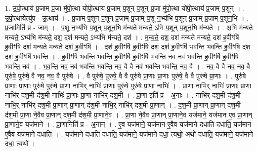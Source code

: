 \documentclass[17pt]{extarticle}
\begin{document}
1. उ॒पो॒त्थाय॑ प्र॒जाम् प्र॒जा मु॑पो॒त्था यो॑पो॒त्थाय॑ प्र॒जाम् प॒शून् प॒शून् प्र॒जा मु॑पो॒त्था यो॑पो॒त्थाय॑ प्र॒जाम् प॒शून् । . उ॒पो॒त्थायेत्यु॑प - उ॒त्थाय॑ । . प्र॒जाम् प॒शून् प॒शून् प्र॒जाम् प्र॒जाम् प॒शू न॒भ्य॑भि प॒शून् प्र॒जाम् प्र॒जाम् प॒शून॒भि । . प्र॒जामिति॑ प्र - जाम् । . प॒शू न॒भ्य॑भि प॒शून् प॒शून॒भि म॑न्यते मन्यते॒ ऽभि प॒शून् प॒शून॒भि म॑न्यते । . अ॒भि म॑न्यते मन्यते॒ ऽभ्य॑भि म॑न्यते॒ दश॒ दश॑ मन्यते॒ ऽभ्य॑भि म॑न्यते॒ दश॑ । . म॒न्य॒ते॒ दश॒ दश॑ मन्यते मन्यते॒ दश॑ ह॒वीꣳषि॑ ह॒वीꣳषि॒ दश॑ मन्यते मन्यते॒ दश॑ ह॒वीꣳषि॑ । . दश॑ ह॒वीꣳषि॑ ह॒वीꣳषि॒ दश॒ दश॑ ह॒वीꣳषि॑ भवन्ति भवन्ति ह॒वीꣳषि॒ दश॒ दश॑ ह॒वीꣳषि॑ भवन्ति । . ह॒वीꣳषि॑ भवन्ति भवन्ति ह॒वीꣳषि॑ ह॒वीꣳषि॑ भवन्ति॒ नव॒ नव॑ भवन्ति ह॒वीꣳषि॑ ह॒वीꣳषि॑ भवन्ति॒ नव॑ । . भ॒व॒न्ति॒ नव॒ नव॑ भवन्ति भवन्ति॒ नव॒ वै वै नव॑ भवन्ति भवन्ति॒ नव॒ वै । . नव॒ वै वै नव॒ नव॒ वै पुरु॑षे॒ पुरु॑षे॒ वै नव॒ नव॒ वै पुरु॑षे । . वै पुरु॑षे॒ पुरु॑षे॒ वै वै पुरु॑षे प्रा॒णाः प्रा॒णाः पुरु॑षे॒ वै वै पुरु॑षे प्रा॒णाः । . पुरु॑षे प्रा॒णाः प्रा॒णाः पुरु॑षे॒ पुरु॑षे प्रा॒णा नाभि॒र् नाभिः॑ प्रा॒णाः पुरु॑षे॒ पुरु॑षे प्रा॒णा नाभिः॑ । . प्रा॒णा नाभि॒र् नाभिः॑ प्रा॒णाः प्रा॒णा नाभि॑र् दश॒मी द॑श॒मी नाभिः॑ प्रा॒णाः प्रा॒णा नाभि॑र् दश॒मी । . प्रा॒णा इति॑ प्र - अ॒नाः । . नाभि॑र् दश॒मी द॑श॒मी नाभि॒र् नाभि॑र् दश॒मी प्रा॒णान् प्रा॒णान् द॑श॒मी नाभि॒र् नाभि॑र् दश॒मी प्रा॒णान् । . द॒श॒मी प्रा॒णान् प्रा॒णान् द॑श॒मी द॑श॒मी प्रा॒णा ने॒वैव प्रा॒णान् द॑श॒मी द॑श॒मी प्रा॒णाने॒व । . प्रा॒णा ने॒वैव प्रा॒णान् प्रा॒णाने॒व यज॑माने॒ यज॑मान ए॒व प्रा॒णान् प्रा॒णाने॒व यज॑माने । . प्रा॒णानिति॑ प्र - अ॒नान् । . ए॒व यज॑माने॒ यज॑मान ए॒वैव यज॑माने दधाति दधाति॒ यज॑मान ए॒वैव यज॑माने दधाति । . यज॑माने दधाति दधाति॒ यज॑माने॒ यज॑माने दधा॒ त्यथो॒ अथो॑ दधाति॒ यज॑माने॒ यज॑माने दधा॒ त्यथो᳚ । \newline
\end{document}
